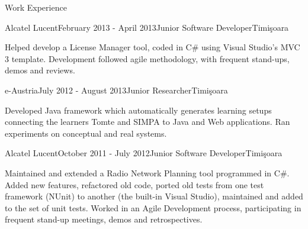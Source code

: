 \documentclass{resume} %
\begin{document}
\begin{rSection}{Work Experience}
\item \begin{rSubsection}{Alcatel Lucent}{February 2013 - April 2013}{Junior Software Developer}{Timi\c{s}oara}
\item Helped develop a License Manager tool, coded in C\# using Visual Studio's MVC 3 template. Development followed agile methodology, with frequent stand-ups, demos and reviews.
\end{rSubsection}

\newpage

\begin{rSubsection}{e-Austria}{July 2012 - August 2013}{Junior Researcher}{Timi\c{s}oara}
\item Developed Java framework which automatically generates learning setups connecting the learners Tomte and SIMPA to Java and Web applications. Ran experiments on conceptual and real systems.
\end{rSubsection}



\begin{rSubsection}{Alcatel Lucent}{October 2011 - July 2012}{Junior Software Developer}{Timi\c{s}oara}
\item Maintained and extended a Radio Network Planning tool programmed in C\#. Added new features, refactored old code, ported old tests from one test framework (NUnit) to another (the built-in Visual Studio), maintained and added to the set of unit tests. Worked in an Agile Development process, participating in frequent stand-up meetings, demos and retrospectives.
\end{rSubsection}
\end{rSection}



\end{document}
